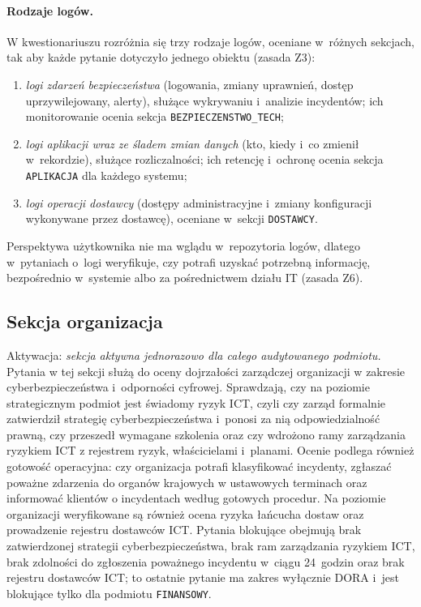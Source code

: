 \begin{enumerate}[label=(Z\arabic*)]
\end{enumerate}

\paragraph{Rodzaje logów.}
W kwestionariuszu rozróżnia się trzy rodzaje logów, oceniane w~różnych sekcjach, tak aby każde pytanie dotyczyło jednego obiektu (zasada Z3):
\begin{enumerate}[label=(\roman*)]
  \item \textit{logi zdarzeń bezpieczeństwa} (logowania, zmiany uprawnień, dostęp uprzywilejowany, alerty), służące wykrywaniu i~analizie incydentów; ich monitorowanie ocenia sekcja \texttt{BEZPIECZENSTWO\_TECH};
  \item \textit{logi aplikacji wraz ze śladem zmian danych} (kto, kiedy i~co zmienił w~rekordzie), służące rozliczalności; ich retencję i~ochronę ocenia sekcja \texttt{APLIKACJA} dla każdego systemu;
  \item \textit{logi operacji dostawcy} (dostępy administracyjne i~zmiany konfiguracji wykonywane przez dostawcę), oceniane w~sekcji \texttt{DOSTAWCY}.
\end{enumerate}
Perspektywa użytkownika nie ma wglądu w~repozytoria logów, dlatego w~pytaniach o~logi weryfikuje, czy potrafi uzyskać potrzebną informację, bezpośrednio w~systemie albo za pośrednictwem działu IT (zasada Z6).


\subsection{Sekcja organizacja}
\noindent Aktywacja: \textit{sekcja aktywna jednorazowo dla całego audytowanego podmiotu.}\\
Pytania w tej sekcji służą do oceny dojrzałości zarządczej organizacji w zakresie cyberbezpieczeństwa i~odporności cyfrowej. Sprawdzają, czy na poziomie strategicznym podmiot jest świadomy ryzyk ICT, czyli czy zarząd formalnie zatwierdził strategię cyberbezpieczeństwa i~ponosi za nią odpowiedzialność prawną, czy przeszedł wymagane szkolenia oraz czy wdrożono ramy zarządzania ryzykiem ICT z rejestrem ryzyk, właścicielami i~planami. Ocenie podlega również gotowość operacyjna: czy organizacja potrafi klasyfikować incydenty, zgłaszać poważne zdarzenia do organów krajowych w ustawowych terminach oraz informować klientów o incydentach według gotowych procedur. Na poziomie organizacji weryfikowane są również ocena ryzyka łańcucha dostaw oraz prowadzenie rejestru dostawców ICT. Pytania blokujące obejmują brak zatwierdzonej strategii cyberbezpieczeństwa, brak ram zarządzania ryzykiem ICT, brak zdolności do zgłoszenia poważnego incydentu w~ciągu 24~godzin oraz brak rejestru dostawców ICT; to ostatnie pytanie ma zakres wyłącznie DORA i~jest blokujące tylko dla podmiotu \texttt{FINANSOWY}.



